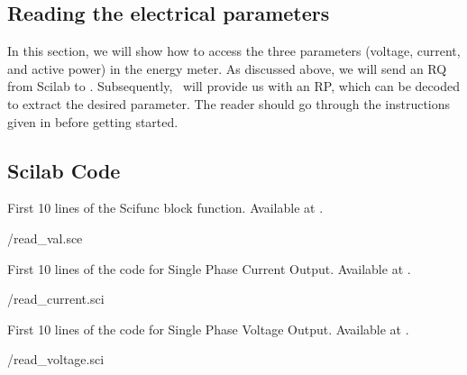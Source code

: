 \subsection{Reading the electrical parameters}
In this section, we will show how to access the three parameters (voltage, current, and active power) in the energy meter. As discussed above, we will send an RQ from Scilab to \arduino. Subsequently, \arduino\ will provide us with an RP, which can be decoded to extract the desired parameter. The reader should go through the instructions given in  before getting started. 

%   

\subsection{Scilab Code}
\label{sec:modbus-scilab-code}

\begin{scicode}
  {First 10 lines of the Scifunc block function.  Available at
    .}
  \label{sci:val-modbus}
  
  {\LocMODscicode/read_val.sce}
\end{scicode}

\begin{scicode}
  {First 10 lines of the code for Single Phase Current Output.
    Available at .}
  \label{sci:current-modbus}
  
  {\LocMODscicode/read_current.sci}
\end{scicode}

\begin{scicode}
  {First 10 lines of the code for Single Phase Voltage Output.
    Available at .}
  \label{sci:voltage-modbus}
  
  {\LocMODscicode/read_voltage.sci}
\end{scicode}

